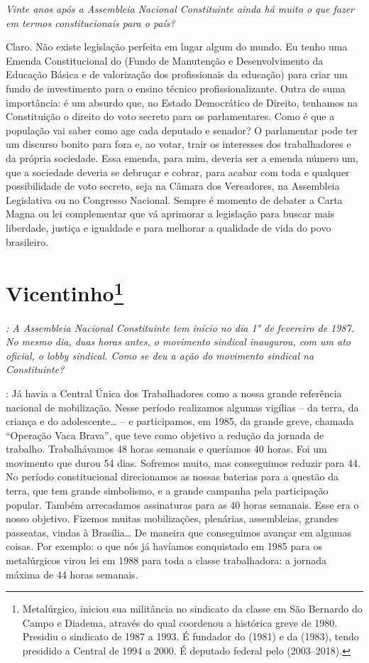 \medskip

\noindent\emph{Vinte anos após a Assembleia Nacional Constituinte ainda há
muito o que fazer em termos constitucionais para o país?}

Claro. Não existe legislação perfeita em lugar algum do
mundo. Eu tenho uma Emenda Constitucional do  (Fundo de Manutenção
e Desenvolvimento da Educação Básica e de valorização dos profissionais
da educação) para criar um fundo de investimento para o ensino técnico
profissionalizante. Outra de suma importância: é um absurdo que, no
Estado Democrático de Direito, tenhamos na Constituição o direito do
voto secreto para os parlamentares. Como é que a população vai saber
como age cada deputado e senador? O parlamentar pode ter um discurso
bonito para fora e, ao votar, trair os interesses dos trabalhadores e da
própria sociedade. Essa emenda, para mim, deveria ser a emenda número um,
que a sociedade deveria se debruçar e cobrar, para acabar com toda e
qualquer possibilidade de voto secreto, seja na Câmara dos Vereadores,
na Assembleia Legislativa ou no Congresso Nacional. Sempre é momento de
debater a Carta Magna ou lei complementar que vá aprimorar a legislação
para buscar mais liberdade, justiça e igualdade e para melhorar a
qualidade de vida do povo brasileiro.

\chapter{Vicentinho\footnote{​Metalúrgico, iniciou sua militância no sindicato da classe em São
Bernardo do Campo e Diadema, através do qual coordenou a histórica greve
de 1980. Presidiu o sindicato de 1987 a 1993. É fundador do  (1981) e
da  (1983), tendo presidido a Central de 1994 a 2000. É deputado
federal pelo  (2003--2018).}}

\emph{: A Assembleia Nacional Constituinte tem início no dia 1° de
fevereiro de 1987. No mesmo dia, duas horas antes, o movimento sindical
inaugurou, com um ato oficial, o lobby sindical. Como se deu a ação do
movimento sindical na Constituinte?}

: Já havia a Central Única dos Trabalhadores como a
nossa grande referência nacional de mobilização. Nesse período
realizamos algumas vigílias -- da terra, da criança e do adolescente\ldots{}
-- e participamos, em 1985, da grande greve, chamada ``Operação Vaca
Brava'', que teve como objetivo a redução da jornada de trabalho.
Trabalhávamos 48 horas semanais e queríamos 40 horas. Foi um movimento
que durou 54 dias. Sofremos muito, mas conseguimos reduzir para 44. No
período constitucional direcionamos as nossas baterias para a questão da
terra, que tem grande simbolismo, e a grande campanha pela participação
popular. Também arrecadamos assinaturas para as 40 horas semanais. Esse
era o nosso objetivo. Fizemos muitas mobilizações, plenárias,
assembleias, grandes passeatas, vindas à Brasília\ldots{} De maneira que
conseguimos avançar em algumas coisas. Por exemplo: o que nós já
havíamos conquistado em 1985 para os metalúrgicos virou lei em 1988 para
toda a classe trabalhadora: a jornada máxima de 44 horas semanais.

